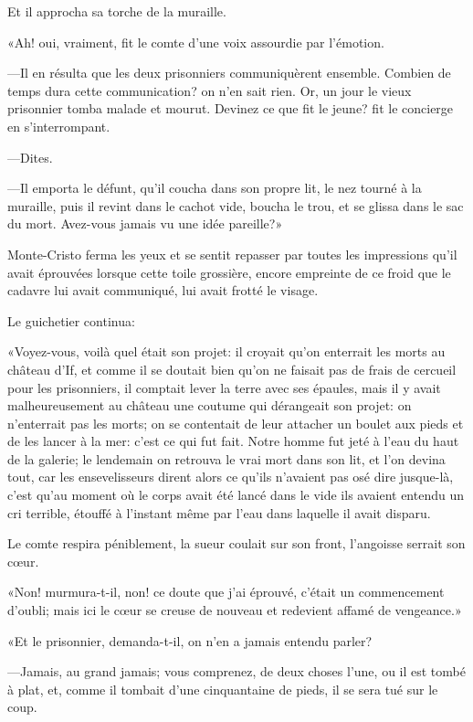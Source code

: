 Et il approcha sa torche de la muraille. 

«Ah! oui, vraiment, fit le comte d'une voix assourdie par l'émotion. 

—Il en résulta que les deux prisonniers communiquèrent ensemble. Combien de temps dura cette communication? on n'en sait rien. Or, un jour le vieux prisonnier tomba malade et mourut. Devinez ce que fit le jeune? fit le concierge en s'interrompant. 

—Dites. 

—Il emporta le défunt, qu'il coucha dans son propre lit, le nez tourné à la muraille, puis il revint dans le cachot vide, boucha le trou, et se glissa dans le sac du mort. Avez-vous jamais vu une idée pareille?» 

Monte-Cristo ferma les yeux et se sentit repasser par toutes les impressions qu'il avait éprouvées lorsque cette toile grossière, encore empreinte de ce froid que le cadavre lui avait communiqué, lui avait frotté le visage. 

Le guichetier continua: 

«Voyez-vous, voilà quel était son projet: il croyait qu'on enterrait les morts au château d'If, et comme il se doutait bien qu'on ne faisait pas de frais de cercueil pour les prisonniers, il comptait lever la terre avec ses épaules, mais il y avait malheureusement au château une coutume qui dérangeait son projet: on n'enterrait pas les morts; on se contentait de leur attacher un boulet aux pieds et de les lancer à la mer: c'est ce qui fut fait. Notre homme fut jeté à l'eau du haut de la galerie; le lendemain on retrouva le vrai mort dans son lit, et l'on devina tout, car les ensevelisseurs dirent alors ce qu'ils n'avaient pas osé dire jusque-là, c'est qu'au moment où le corps avait été lancé dans le vide ils avaient entendu un cri terrible, étouffé à l'instant même par l'eau dans laquelle il avait disparu. 

Le comte respira péniblement, la sueur coulait sur son front, l'angoisse serrait son cœur. 

«Non! murmura-t-il, non! ce doute que j'ai éprouvé, c'était un commencement d'oubli; mais ici le cœur se creuse de nouveau et redevient affamé de vengeance.» 

«Et le prisonnier, demanda-t-il, on n'en a jamais entendu parler? 

—Jamais, au grand jamais; vous comprenez, de deux choses l'une, ou il est tombé à plat, et, comme il tombait d'une cinquantaine de pieds, il se sera tué sur le coup. 

